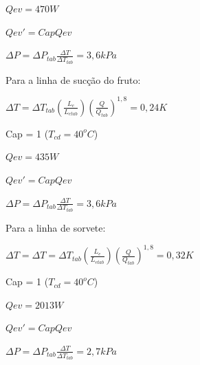 \documentclass[10pt,a4paper]{article}
\begin{document}
$Qev =470 W $ 

$Qev' = Cap Qev$

$\Delta P = \Delta P_{tab} \frac{\Delta T}{\Delta T_{tab}} = 3,6 kPa$

Para a linha de sucção do fruto:

$\Delta T = \Delta T_{tab} (\frac{L_e}{L_{etab}}) (\frac{Q}{Q_{tab}})^{1,8}= 0,24 K$

Cap = 1 ($T_{cd} = 40^o C$)

$Qev =435 W $ 

$Qev' = Cap Qev$

$\Delta P = \Delta P_{tab} \frac{\Delta T}{\Delta T_{tab}} = 3,6 kPa$

Para a linha de sorvete:

$\Delta T = \Delta T = \Delta T_{tab} (\frac{L_e}{L_{etab}}) (\frac{Q}{Q_{tab}})^{1,8} = 0,32 K$

Cap = 1 ($T_{cd} = 40^o C$)

$Qev =2013 W $ 

$Qev' = Cap Qev$

$\Delta P = \Delta P_{tab} \frac{\Delta T}{\Delta T_{tab}} = 2,7 kPa$


\begin{landscape}

\end{landscape}

\begin{landscape}

\end{landscape}

\begin{landscape}

\end{landscape}

\begin{landscape}

\end{landscape}

\begin{landscape}

\end{landscape}

\begin{landscape}

\end{landscape}

\begin{landscape}

\end{landscape}
\end{document}
